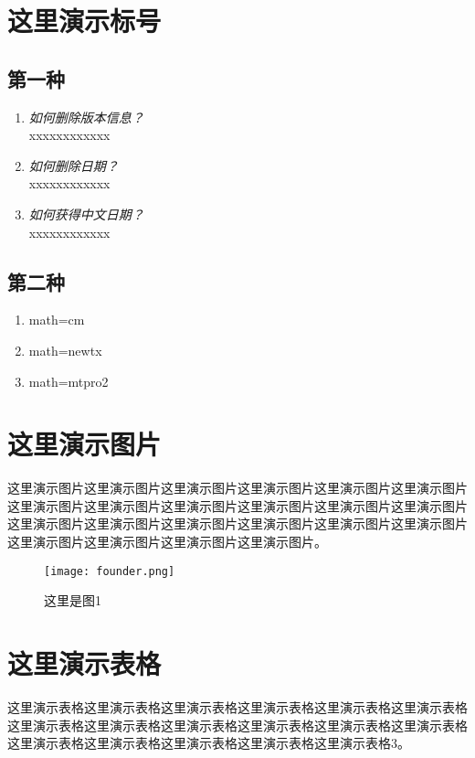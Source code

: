 \documentclass[lang=cn,11pt,a4paper,cite=numbers]{elegantpaper}
\begin{document}
\section{这里演示标号}
\subsection{第一种}
\begin{enumerate}[label=\arabic*).]
  \item \textit{如何删除版本信息？}\\
    xxxxxxxxxxxx
  \item \textit{如何删除日期？}\\
    xxxxxxxxxxxx
  \item \textit{如何获得中文日期？}\\
    xxxxxxxxxxxx
\end{enumerate}
\subsection{第二种}
\begin{enumerate}
  \item math=cm
  \item math=newtx
  \item math=mtpro2
\end{enumerate}

\section{这里演示图片}
这里演示图片这里演示图片这里演示图片这里演示图片这里演示图片这里演示图片这里演示图片这里演示图片这里演示图片这里演示图片这里演示图片这里演示图片这里演示图片这里演示图片这里演示图片这里演示图片这里演示图片这里演示图片这里演示图片这里演示图片这里演示图片这里演示图片。
\begin{figure}[!htb]
\centering
\texttt{[image: founder.png]}
\caption{这里是图1}
\end{figure}


\section{这里演示表格}
这里演示表格这里演示表格这里演示表格这里演示表格这里演示表格这里演示表格这里演示表格这里演示表格这里演示表格这里演示表格这里演示表格这里演示表格这里演示表格这里演示表格这里演示表格这里演示表格这里演示表格3。
\end{document}
